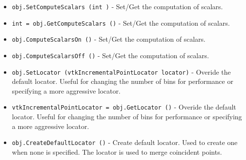 \begin{itemize}
\item  \verb|obj.SetComputeScalars (int )| -  Set/Get the computation of scalars.

\item  \verb|int = obj.GetComputeScalars ()| -  Set/Get the computation of scalars.

\item  \verb|obj.ComputeScalarsOn ()| -  Set/Get the computation of scalars.

\item  \verb|obj.ComputeScalarsOff ()| -  Set/Get the computation of scalars.

\item  \verb|obj.SetLocator (vtkIncrementalPointLocator locator)| -  Overide the default locator.  Useful for changing the number of
 bins for performance or specifying a more aggressive locator.

\item  \verb|vtkIncrementalPointLocator = obj.GetLocator ()| -  Overide the default locator.  Useful for changing the number of
 bins for performance or specifying a more aggressive locator.

\item  \verb|obj.CreateDefaultLocator ()| -  Create default locator. Used to create one when none is
 specified. The locator is used to merge coincident points.

\end{itemize}
